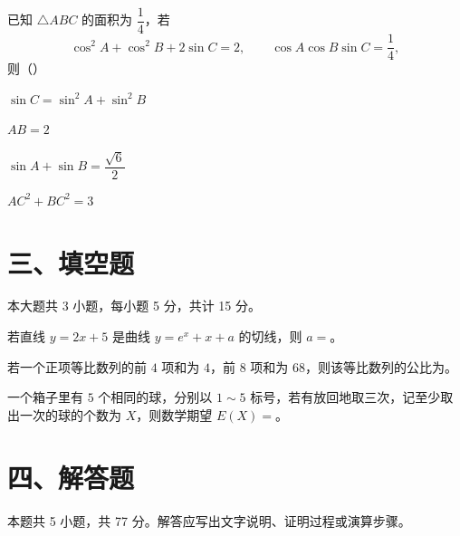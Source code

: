 \documentclass[zihao=-4]{exam-zh}
\begin{document}
\begin{question}[points=6]
已知 $\triangle ABC$ 的面积为 $\dfrac14$，若
\[
\cos^2 A+\cos^2 B+2\sin C=2,\qquad \cos A\cos B\sin C=\dfrac14,
\]
则（\quad）
\begin{choices}
  \item $\sin C=\sin^2 A+\sin^2 B$
  \item $AB=2$
  \item $\sin A+\sin B=\dfrac{\sqrt6}{2}$
  \item $AC^2+BC^2=3$
\end{choices}
\end{question}

\section*{三、填空题}

本大题共 3 小题，每小题 5 分，共计 15 分。

\begin{question}[points=5]
若直线 $y=2x+5$ 是曲线 $y=e^x+x+a$ 的切线，则 $a=$\fillin。
\end{question}

\begin{question}[points=5]
若一个正项等比数列的前 $4$ 项和为 $4$，前 $8$ 项和为 $68$，则该等比数列的公比为\fillin。
\end{question}

\begin{question}[points=5]
一个箱子里有 $5$ 个相同的球，分别以 $1\sim 5$ 标号，若有放回地取三次，记至少取出一次的球的个数为 $X$，则数学期望 $E(X)=$\fillin。
\end{question}

\section*{四、解答题}

本题共 5 小题，共 77 分。解答应写出文字说明、证明过程或演算步骤。
\end{document}
